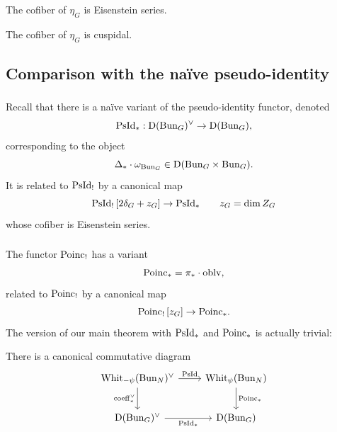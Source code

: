 \begin{lemma}
\label{lemma:cofib_eta_Eis}
The cofiber of $\eta_G$ is Eisenstein series.
\end{lemma}

\begin{lemma}
\label{lemma:cofib_eta_cusp}
The cofiber of $\eta_G$ is cuspidal.
\end{lemma}

\subsection{Comparison with the na\"ive pseudo-identity}

\subsubsection{} Recall that there is a na\"ive variant of the pseudo-identity functor, denoted
    \[\mathrm{PsId}_* : \mathrm{D}(\mathrm{Bun}_G)^\vee \to \mathrm{D}(\mathrm{Bun}_G),\]
corresponding to the object
    \[\Delta_* \cdot \omega_{\mathrm{Bun}_G} \in \mathrm{D}(\mathrm{Bun}_G \times \mathrm{Bun}_G).\]
It is related to $\mathrm{PsId}_!$ by a canonical map
    \[
    \mathrm{PsId}_! \, [2 \delta_G + z_G] \to \mathrm{PsId}_*
    \qquad
    z_G = \dim Z_G
    \]
whose cofiber is Eisenstein series.

\subsubsection{} The functor $\mathrm{Poinc}_!$ has a variant
    \[\mathrm{Poinc}_* = \pi_* \cdot \mathrm{oblv},\]
related to $\mathrm{Poinc}_!$ by a canonical map
\begin{equation}
    \label{eqn:Poinc*!2}
    \mathrm{Poinc}_! \, [z_G] \to \mathrm{Poinc}_*.
\end{equation}
The version of our main theorem with $\mathrm{PsId}_*$ and $\mathrm{Poinc}_*$ is actually trivial:

\begin{proposition}
\label{proposition:trivial_thm}
There is a canonical commutative diagram
\[
\begin{tikzcd}[
  column sep={10em,between origins},
  row sep={4em,between origins}
]
    \Whit_{-\psi}(\Bun_N)^\vee \arrow[d, "\coeff_*^\vee" left] \arrow[r, "\PsId"] & \Whit_\psi(\Bun_N) \arrow[d, "\Poinc_*"] \\
    \DMod(\Bun_G)^\vee \arrow[r, "\PsId_*" below] & \DMod(\Bun_G)
\end{tikzcd}
\]
\end{proposition}

